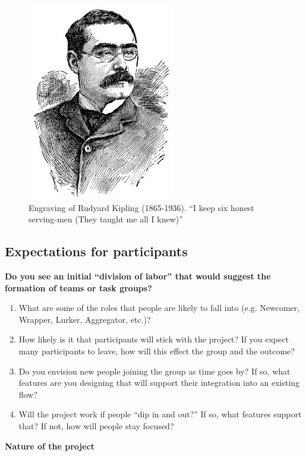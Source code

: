 \begin{figure}
\begin{center}
\includegraphics{./pictures/kipling.jpg}
\caption{Engraving of Rudyard Kipling (1865-1936). ``I keep six honest
serving-men (They taught me all I knew)''}
\end{center}
\end{figure}

\subsection{Expectations for participants}

\textbf{Do you see an initial ``division of labor'' that would suggest
the formation of teams or task groups?}

\begin{enumerate}
\item
  What are some of the roles that people are likely to fall into (e.g.
  Newcomer, Wrapper, Lurker, Aggregator, etc.)?
\item
  How likely is it that participants will stick with the project? If you
  expect many participants to leave, how will this effect the group and
  the outcome?
\item
  Do you envision new people joining the group as time goes by? If so,
  what features are you designing that will support their integration
  into an existing flow?
\item
  Will the project work if people ``dip in and out?'' If so, what
  features support that? If not, how will people stay focused?
\end{enumerate}

\textbf{Nature of the project}

